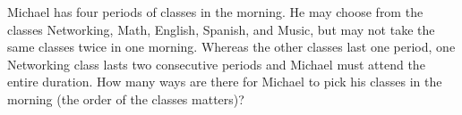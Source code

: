Michael has four periods of classes in the morning. He may choose from the classes Networking, Math, English, Spanish, and Music, but may not take the same classes twice in one morning. Whereas the other classes last one period, one Networking class lasts two consecutive periods and Michael must attend the entire duration. How many ways are there for Michael to pick his classes in the morning (the order of the classes matters)?
